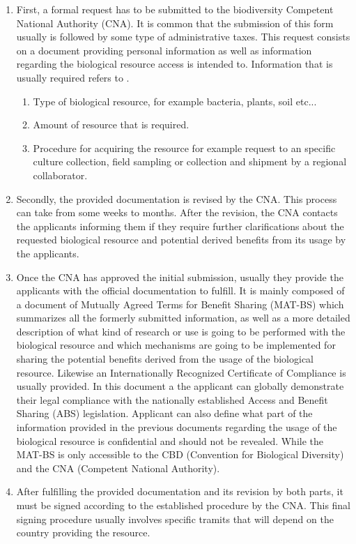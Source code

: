 \begin{enumerate}
\item First, a formal request has to be submitted to the biodiversity Competent National Authority (CNA). It is common that the submission of this form usually is followed by some type of administrative taxes. This request consists on a document providing personal information as well as information regarding the biological resource access is intended to. Information that is usually required refers to .
\begin{enumerate}
\item Type of biological resource, for example bacteria, plants, soil etc...
\item Amount of resource that is required.
\item Procedure for acquiring the resource for example request to an specific culture collection, field sampling or collection and shipment by a regional collaborator.
\end{enumerate}
\item Secondly, the provided documentation is revised by the CNA. This process can take from some weeks to months. After the revision, the CNA contacts the applicants informing them if they require further clarifications about the requested biological resource and potential derived benefits from its usage by the applicants. 
\item Once the CNA has approved the initial submission, usually they provide the applicants with the official documentation to fulfill. 
It is mainly composed of a document of Mutually Agreed Terms for Benefit Sharing (MAT-BS) which summarizes all the formerly submitted information, as well as a more detailed description of what kind of research or use is going to be performed with the biological resource and which mechanisms are going to be implemented for sharing the potential benefits derived from the usage of the biological resource.
Likewise an Internationally Recognized Certificate of Compliance is usually provided. In this document a the applicant can globally demonstrate their legal compliance with
the nationally established Access and Benefit Sharing (ABS) legislation. Applicant can also define what part of the information provided in the previous documents regarding the usage of the biological resource is confidential and should not be revealed. While the MAT-BS is only accessible to the CBD (Convention for Biological Diversity) and the CNA (Competent National Authority).
\item After fulfilling the provided documentation and its revision by both parts, it must be signed according to the established procedure by the CNA. This final signing procedure usually involves specific tramits that will depend on the country providing the resource. 

\end{enumerate}
